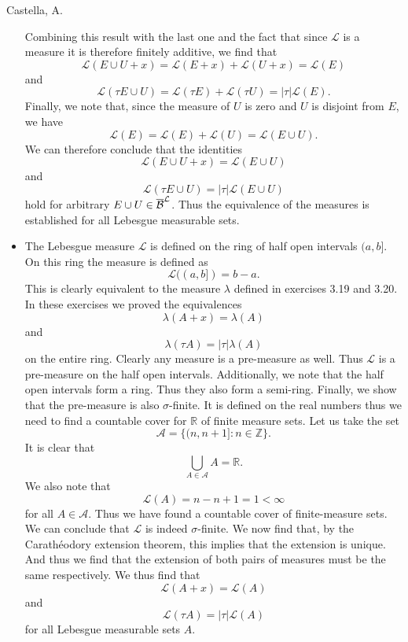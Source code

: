 \begin{solution}[4.10]{Castella, A.}
\begin{itemize}
$$        $$
        Combining this result with the last one and the fact that since $\mathcal{L}$ is a measure it is therefore finitely additive, we find that
        $$
            \mathcal{L}(E \cup U + x) = \mathcal{L}(E + x) + \mathcal{L}(U + x) = \mathcal{L}(E)
        $$
        and
        $$
            \mathcal{L}(\tau E\cup U) = \mathcal{L}(\tau E) + \mathcal{L}(\tau U) = |\tau|\mathcal{L}(E).
        $$
        Finally, we note that, since the measure of $U$ is zero and $U$ is disjoint from $E$, we have
        $$
            \mathcal{L}(E) = \mathcal{L}(E) + \mathcal{L}(U) = \mathcal{L}(E \cup U).
        $$
        We can therefore conclude that the identities
        $$
            \mathcal{L}(E\cup U + x) = \mathcal{L}(E\cup U)
        $$
        and
        $$
            \mathcal{L}(\tau E\cup U) = |\tau|\mathcal{L}(E\cup U)
        $$
        hold for arbitrary $E \cup U \in \overline{\mathcal B}^\mathcal{L}$. Thus the equivalence of the measures is established for all Lebesgue measurable sets.
        \item The Lebesgue measure $\mathcal{L}$ is defined on the ring of half open intervals $(a, b]$. On this ring the measure is defined as
        $$
            \mathcal{L}((a,b]) = b - a.
        $$
        This is clearly equivalent to the measure $\lambda$ defined in exercises 3.19 and 3.20. In these exercises we proved the equivalences
        $$
            \lambda(A + x) = \lambda(A)
        $$
        and
        $$
            \lambda(\tau A) = |\tau|\lambda(A)
        $$
        on the entire ring. Clearly any measure is a pre-measure as well. Thus $\mathcal{L}$ is a pre-measure on the half open intervals. Additionally, we note that the half open intervals form a ring. Thus they also form a semi-ring. Finally, we show that the pre-measure is also $\sigma$-finite. It is defined on the real numbers thus we need to find a countable cover for $\mathbb{R}$ of finite measure sets. Let us take the set
        $$
            \mathcal{A} = \{(n, n+1] : n\in \mathbb{Z}\}.
        $$
        It is clear that
        $$
            \bigcup_{A \in \mathcal{A}}A = \mathbb{R}.
        $$
        We also note that
        $$
            \mathcal{L}(A) = n - n+1 = 1 < \infty
        $$
        for all $A \in \mathcal{A}$. Thus we have found a countable cover of finite-measure sets. We can conclude that $\mathcal{L}$ is indeed $\sigma$-finite. We now find that, by the Carath\'{e}odory extension theorem, this implies that the extension is unique. And thus we find that the extension of both pairs of measures must be the same respectively. We thus find that
        $$
            \mathcal{L}(A + x) = \mathcal{L}(A)
        $$
        and
        $$
            \mathcal{L}(\tau A) = |\tau|\mathcal{L}(A)
        $$
        for all Lebesgue measurable sets $A$.
    \end{itemize}
\end{solution}